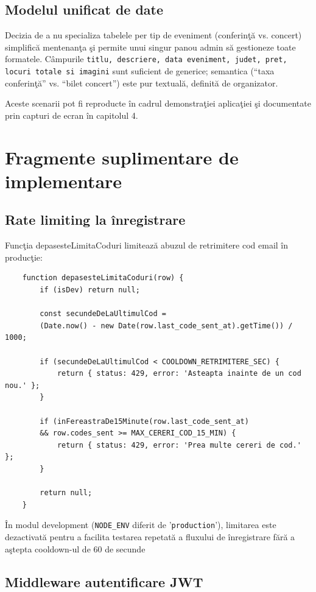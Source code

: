 \subsection{Modelul unificat de date}

Decizia de a nu specializa tabelele per tip de eveniment (conferin\c t\u a vs. concert) simplific\u a mentenan\c ta \c si permite unui singur panou admin s\u a gestioneze toate formatele. C\^ampurile \texttt{titlu, descriere, data eveniment, judet, pret, locuri totale \linebreak si imagini} sunt suficient de generice; semantica (``taxa conferin\c t\u a'' vs. ``bilet concert'') este pur textual\u a, definit\u a de organizator.

Aceste scenarii pot fi reproducte \^in cadrul demonstra\c tiei aplica\c tiei \c si documentate prin capturi de ecran \^in capitolul 4.

\section{Fragmente suplimentare de implementare}
\subsection{Rate limiting la \^inregistrare}

Func\c tia depasesteLimitaCoduri limiteaz\u a abuzul de retrimitere cod email \^in produc\c tie:

\begin{lstlisting}
	function depasesteLimitaCoduri(row) {
		if (isDev) return null;
		
		const secundeDeLaUltimulCod =
		(Date.now() - new Date(row.last_code_sent_at).getTime()) / 1000;
		
		if (secundeDeLaUltimulCod < COOLDOWN_RETRIMITERE_SEC) {
			return { status: 429, error: 'Asteapta inainte de un cod nou.' };
		}
		
		if (inFereastraDe15Minute(row.last_code_sent_at)
		&& row.codes_sent >= MAX_CERERI_COD_15_MIN) {
			return { status: 429, error: 'Prea multe cereri de cod.' };
		}
		
		return null;
	}
\end{lstlisting}

\^In modul development (\texttt{NODE\_ENV} diferit de '\texttt{production}'), limitarea este dezactivat\u a pentru a facilita testarea repetat\u a a fluxului de \^inregistrare f\u ar\u a a a\c stepta cooldown-ul de 60 de secunde

\subsection{Middleware autentificare JWT}

